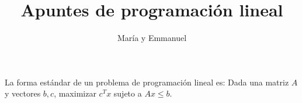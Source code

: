 \documentclass{article}
\title{Apuntes de programación lineal}
\author{María y Emmanuel}
\begin{document}
\maketitle

La forma estándar de un problema de programación lineal es:
Dada una matriz $A$ y vectores $b,c$, maximizar $c^Tx$ sujeto a
$Ax\leq b$.
\end{document}
